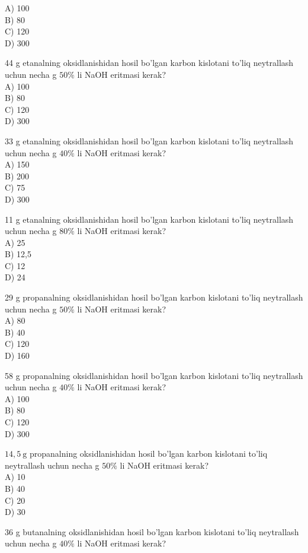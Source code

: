 A) 100\\
B) 80\\
C) 120\\
D) 300
  \item 44 g etanalning oksidlanishidan hosil bo'lgan karbon kislotani to'liq neytrallash uchun necha g $50 \%$ li NaOH eritmasi kerak?\\
A) 100\\
B) 80\\
C) 120\\
D) 300
  \item 33 g etanalning oksidlanishidan hosil bo'lgan karbon kislotani to'liq neytrallash\\
uchun necha g $40 \%$ li NaOH eritmasi kerak?\\
A) 150\\
B) 200\\
C) 75\\
D) 300
  \item 11 g etanalning oksidlanishidan hosil bo'lgan karbon kislotani to'liq neytrallash uchun necha g $80 \%$ li NaOH eritmasi kerak?\\
A) 25\\
B) 12,5\\
C) 12\\
D) 24
  \item 29 g propanalning oksidlanishidan hosil bo'lgan karbon kislotani to'liq neytrallash uchun necha g $50 \%$ li NaOH eritmasi kerak?\\
A) 80\\
B) 40\\
C) 120\\
D) 160
  \item 58 g propanalning oksidlanishidan hosil bo'lgan karbon kislotani to'liq neytrallash uchun necha g $40 \%$ li NaOH eritmasi kerak?\\
A) 100\\
B) 80\\
C) 120\\
D) 300
  \item $14,5 \mathrm{~g}$ propanalning oksidlanishidan hosil bo'lgan karbon kislotani to'liq neytrallash uchun necha g $50 \%$ li NaOH eritmasi kerak?\\
A) 10\\
B) 40\\
C) 20\\
D) 30
  \item 36 g butanalning oksidlanishidan hosil bo'lgan karbon kislotani to'liq neytrallash uchun necha g $40 \%$ li NaOH eritmasi kerak?\\
